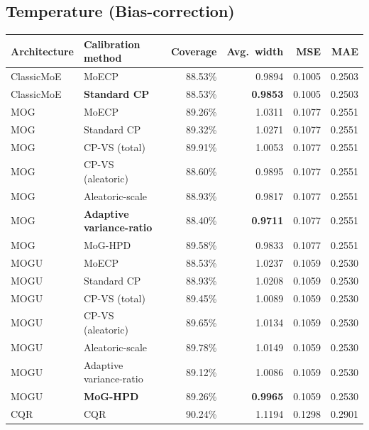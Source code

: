 \documentclass[11pt]{article}
\begin{document}
\subsection{Temperature (Bias-correction)}
\begin{center}
\begin{tabular}{@{}llrrrr@{}}
\toprule
\textbf{Architecture} & \textbf{Calibration method} & \textbf{Coverage} & \textbf{Avg.\ width} &
\textbf{MSE} & \textbf{MAE} \\
\midrule
ClassicMoE & MoECP              & 88.53\% & 0.9894 & 0.1005 & 0.2503 \\
ClassicMoE & \textbf{Standard CP} & 88.53\% & \textbf{0.9853} & 0.1005 & 0.2503 \\
\midrule
MOG & MoECP                     & 89.26\% & 1.0311 & 0.1077 & 0.2551 \\
MOG & Standard CP               & 89.32\% & 1.0271 & 0.1077 & 0.2551 \\
MOG & CP-VS (total)             & 89.91\% & 1.0053 & 0.1077 & 0.2551 \\
MOG & CP-VS (aleatoric)         & 88.60\% & 0.9895 & 0.1077 & 0.2551 \\
MOG & Aleatoric-scale           & 88.93\% & 0.9817 & 0.1077 & 0.2551 \\
MOG & \textbf{Adaptive variance-ratio} & 88.40\% & \textbf{0.9711} & 0.1077 & 0.2551 \\
MOG & MoG-HPD                   & 89.58\% & 0.9833 & 0.1077 & 0.2551 \\
\midrule
MOGU & MoECP                    & 88.53\% & 1.0237 & 0.1059 & 0.2530 \\
MOGU & Standard CP              & 88.93\% & 1.0208 & 0.1059 & 0.2530 \\
MOGU & CP-VS (total)            & 89.45\% & 1.0089 & 0.1059 & 0.2530 \\
MOGU & CP-VS (aleatoric)        & 89.65\% & 1.0134 & 0.1059 & 0.2530 \\
MOGU & Aleatoric-scale          & 89.78\% & 1.0149 & 0.1059 & 0.2530 \\
MOGU & Adaptive variance-ratio  & 89.12\% & 1.0086 & 0.1059 & 0.2530 \\
MOGU & \textbf{MoG-HPD}         & 89.26\% & \textbf{0.9965} & 0.1059 & 0.2530 \\
\midrule
CQR & CQR                       & 90.24\% & 1.1194 & 0.1298 & 0.2901 \\
\bottomrule
\end{tabular}
\end{center}
\end{document}
